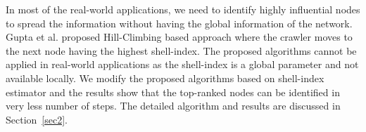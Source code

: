 \documentclass[conference]{IEEEtran}
\begin{document}


In most of the real-world applications, we need to identify highly influential nodes to spread the information without having the global information of the network. Gupta et al. \cite{gupta2016pseudo} proposed Hill-Climbing based approach where the crawler moves to the next node having the highest shell-index. The proposed algorithms cannot be applied in real-world applications as the shell-index is a global parameter and not available locally. We modify the proposed algorithms based on shell-index estimator and the results show that the top-ranked nodes can be identified in very less number of steps. 
The detailed algorithm and results are discussed in Section~\ref{sec2}.


\end{document}
